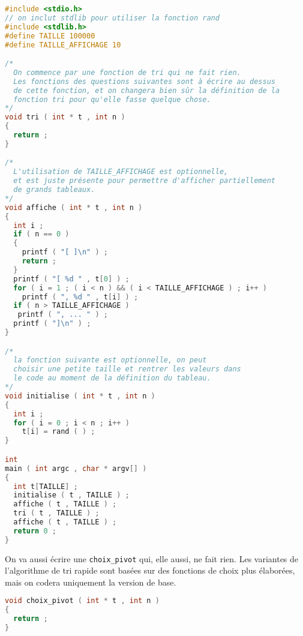\begin{solution}
  \begin{lstlisting}[language=C]
#include <stdio.h>
// on inclut stdlib pour utiliser la fonction rand
#include <stdlib.h>
#define TAILLE 100000
#define TAILLE_AFFICHAGE 10

/*
  On commence par une fonction de tri qui ne fait rien.
  Les fonctions des questions suivantes sont à écrire au dessus
  de cette fonction, et on changera bien sûr la définition de la 
  fonction tri pour qu'elle fasse quelque chose.
*/
void tri ( int * t , int n )
{
  return ;
}  

/*
  L'utilisation de TAILLE_AFFICHAGE est optionnelle,
  et est juste présente pour permettre d'afficher partiellement 
  de grands tableaux.
*/
void affiche ( int * t , int n )
{
  int i ;
  if ( n == 0 )
  {
    printf ( "[ ]\n" ) ;
    return ;
  }
  printf ( "[ %d " , t[0] ) ;
  for ( i = 1 ; ( i < n ) && ( i < TAILLE_AFFICHAGE ) ; i++ )
    printf ( ", %d " , t[i] ) ;
  if ( n > TAILLE_AFFICHAGE )
   printf ( ", ... " ) ;
  printf ( "]\n" ) ;
}

/*
  la fonction suivante est optionnelle, on peut
  choisir une petite taille et rentrer les valeurs dans
  le code au moment de la définition du tableau.
*/
void initialise ( int * t , int n )
{
  int i ;
  for ( i = 0 ; i < n ; i++ )
    t[i] = rand ( ) ;
}

int
main ( int argc , char * argv[] )
{
  int t[TAILLE] ;
  initialise ( t , TAILLE ) ;
  affiche ( t , TAILLE ) ;
  tri ( t , TAILLE ) ;
  affiche ( t , TAILLE ) ;
  return 0 ;
}

  \end{lstlisting}
\end{solution}



\question On va aussi écrire une \texttt{choix\_pivot} qui, elle
aussi, ne fait rien. Les variantes de l'algorithme de tri rapide sont
basées sur des fonctions de choix plus élaborées, mais on codera
uniquement la version de base.

\begin{solution}
  \begin{lstlisting}[language=C]
void choix_pivot ( int * t , int n )
{
  return ;
}  
  \end{lstlisting}
\end{solution}

